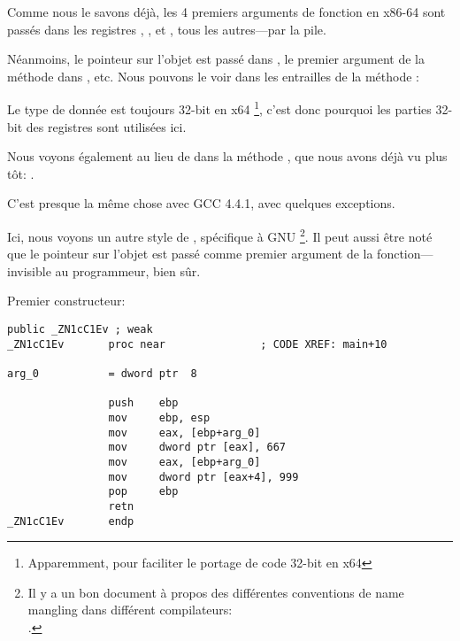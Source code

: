 \label{simple_CPP_MSVC_x64}

Comme nous le savons déjà, les 4 premiers arguments de fonction en x86-64 sont passés
dans les registres \RCX, \RDX,  et , tous les autres---par la pile.

Néanmoins, le pointeur \ITthis sur l'objet est passé dans \RCX, le premier argument
de la méthode dans \RDX, etc.
Nous pouvons le voir dans les entrailles de la méthode :



Le type de donnée \Tint est toujours 32-bit en x64
\footnote{Apparemment, pour faciliter le portage de code 32-bit \CCpp en x64},
c'est donc pourquoi les parties 32-bit des registres sont utilisées ici.

Nous voyons également  au lieu de \RET dans la méthode ,
 que nous avons déjà vu plus tôt: .


C'est presque la même chose avec GCC 4.4.1, avec quelques exceptions.



Ici, nous voyons un autre style de , spécifique à GNU
\footnote{Il y a un bon document à propos des différentes conventions de name mangling
dans différent compilateurs:\\
\InSqBrackets{\AgnerFogCC}.}.
Il peut aussi être noté que le pointeur sur l'objet est passé comme premier argument
de la fonction---invisible au programmeur, bien sûr.


Premier constructeur:

\begin{lstlisting}[style=customasmx86]
                public _ZN1cC1Ev ; weak
_ZN1cC1Ev       proc near               ; CODE XREF: main+10

arg_0           = dword ptr  8

                push    ebp
                mov     ebp, esp
                mov     eax, [ebp+arg_0]
                mov     dword ptr [eax], 667
                mov     eax, [ebp+arg_0]
                mov     dword ptr [eax+4], 999
                pop     ebp
                retn
_ZN1cC1Ev       endp
\end{lstlisting}

